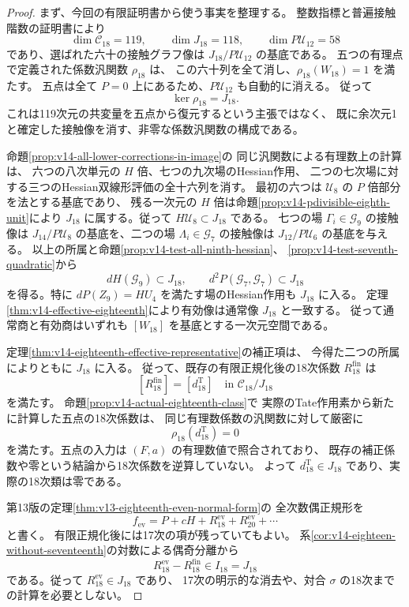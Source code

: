 \begin{proof}
まず、今回の有限証明書から使う事実を整理する。
整数指標と普遍接触階数の証明書により
\[
 \dim\mathcal C_{18}=119,\qquad
 \dim J_{18}=118,\qquad \dim P\mathcal U_{12}=58
\]
であり、選ばれた六十の接触グラフ像は
$J_{18}/P\mathcal U_{12}$ の基底である。
五つの有理点で定義された係数汎関数 $\rho_{18}$ は、
この六十列を全て消し、$\rho_{18}(W_{18})=1$ を満たす。
五点は全て $P=0$ 上にあるため、$P\mathcal U_{12}$ も自動的に消える。
従って
\[
 \ker\rho_{18}=J_{18}.
\]
これは119次元の共変量を五点から復元するという主張ではなく、
既に余次元1と確定した接触像を消す、非零な係数汎関数の構成である。

命題\ref{prop:v14-all-lower-corrections-in-image}の
同じ汎関数による有理数上の計算は、
六つの八次単元の $H$ 倍、七つの九次場のHessian作用、
二つの七次場に対する三つのHessian双線形評価の全十六列を消す。
最初の六つは $\mathcal U_8$ の $P$ 倍部分を法とする基底であり、
残る一次元の $H$ 倍は命題\ref{prop:v14-pdivisible-eighth-unit}により
$J_{18}$ に属する。従って $H\mathcal U_8\subset J_{18}$ である。
七つの場 $\Gamma_i\in\mathcal G_9$ の接触像は
$J_{14}/P\mathcal U_8$ の基底を、二つの場
$\Lambda_i\in\mathcal G_7$ の接触像は
$J_{12}/P\mathcal U_6$ の基底を与える。
以上の所属と命題\ref{prop:v14-test-all-ninth-hessian}、
\ref{prop:v14-test-seventh-quadratic}から
\[
 dH(\mathcal G_9)\subset J_{18},\qquad
 d^2P(\mathcal G_7,\mathcal G_7)\subset J_{18}
\]
を得る。特に $dP(Z_9)=HU_4$ を満たす場のHessian作用も $J_{18}$ に入る。
定理\ref{thm:v14-effective-eighteenth}により有効像は通常像 $J_{18}$ と一致する。
従って通常商と有効商はいずれも $[W_{18}]$ を基底とする一次元空間である。

定理\ref{thm:v14-eighteenth-effective-representative}の補正項は、
今得た二つの所属によりともに $J_{18}$ に入る。
従って、既存の有限正規化後の18次係数 $R_{18}^{\mathrm{fin}}$ は
\[
 [R_{18}^{\mathrm{fin}}]=[d^{\mathrm T}_{18}]
      \quad\text{in }\mathcal C_{18}/J_{18}
\]
を満たす。
命題\ref{prop:v14-actual-eighteenth-class}で
実際のTate作用素から新たに計算した五点の18次係数は、
同じ有理数係数の汎関数に対して厳密に
\[
 \rho_{18}(d^{\mathrm T}_{18})=0
\]
を満たす。五点の入力は $(F,a)$ の有理数値で照合されており、
既存の補正係数や零という結論から18次係数を逆算していない。
よって $d^{\mathrm T}_{18}\in J_{18}$ であり、実際の18次類は零である。

第13版の定理\ref{thm:v13-eighteenth-even-normal-form}の
全次数偶正規形を
\[
 f_{\mathrm{ev}}=P+cH+R_{18}^{\mathrm{ev}}+R_{20}^{\mathrm{ev}}+\cdots
\]
と書く。
有限正規化後には17次の項が残っていてもよい。
系\ref{cor:v14-eighteen-without-seventeenth}の対数による偶奇分離から
\[
 R_{18}^{\mathrm{ev}}-R_{18}^{\mathrm{fin}}\in I_{18}=J_{18}
\]
である。従って $R_{18}^{\mathrm{ev}}\in J_{18}$ であり、
17次の明示的な消去や、対合 $\sigma$ の18次までの計算を必要としない。


\end{proof}
